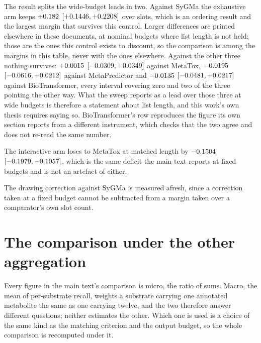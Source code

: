 \documentclass[journal=jcisd8,manuscript=suppinfo,layout=onecolumn]{achemso}
\begin{document}
The result splits the wide-budget leads in two. Against SyGMa the exhaustive arm keeps
$+0.182$ $[+0.1446, +0.2208]$ over
\numMatchedBanksygmaSlots{} slots, which is an ordering result and the largest margin that
survives this control. Larger differences are printed elsewhere in these documents, at nominal
budgets where list length is not held; those are the ones this control exists to discount, so the
comparison is among the margins in this table, never with the ones elsewhere. Against the other
three nothing survives:
$+0.0015$ $[-0.0309, +0.0349]$ against
MetaTox, $-0.0195$
$[-0.0616, +0.0212]$ against MetaPredictor and
$-0.0135$ $[-0.0481,
+0.0217]$ against BioTransformer, every interval covering zero and two
of the three pointing the other way. What the sweep reports as a lead over those three at wide
budgets is therefore a statement about list length, and this work's own thesis requires saying so.
BioTransformer's row reproduces the figure its own section reports from a different instrument,
which checks that the two agree and does not re-read the same number.

The interactive arm loses to MetaTox at matched length by
$-0.1504$
$[-0.1979, -0.1057]$, which is the same deficit the main
text reports at fixed budgets and is not an artefact of either.


The drawing correction against SyGMa is measured afresh, since a correction taken
at a fixed budget cannot be subtracted from a margin taken over a comparator's own slot count.
\section{The comparison under the other aggregation}
\label{sec:si-macro}

Every figure in the main text's comparison is micro, the ratio of sums. Macro, the mean of
per-substrate recall, weights a substrate carrying one annotated metabolite the same as one
carrying twelve, and the two therefore answer different questions; neither estimates the
other. Which one is used is a choice of the same kind as the matching criterion and the output
budget, so the whole comparison is recomputed under it.


\end{document}

